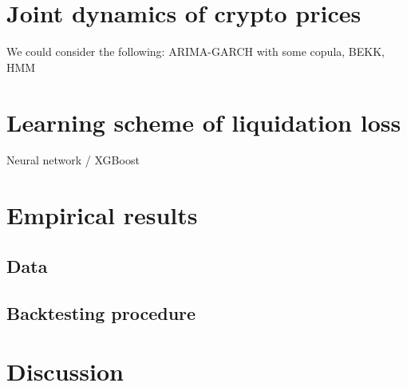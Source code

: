 \documentclass{article} %
\theoremstyle{plain}
\theoremstyle{definition} %
\begin{document}
\section{Joint dynamics of crypto prices}
We could consider the following: ARIMA-GARCH with some copula, BEKK, HMM

\section{Learning scheme of liquidation loss}\label{sec:ML}
Neural network / XGBoost

\section{Empirical results}
\subsection{Data}
\subsection{Backtesting procedure}

\section{Discussion}

\end{document}
